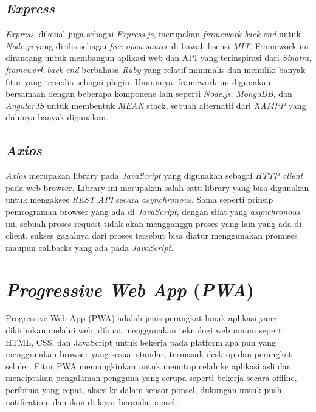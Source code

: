 \subsection{\emph{Express}}
\vspace{1ex}

\emph{Express}, dikenal juga sebagai \emph{Express.js}, merupakan \emph{framework back-end} untuk \emph{Node.js} yang dirilis sebagai \emph{free open-source} di bawah lisensi \emph{MIT}.
Framework ini dirancang untuk membangun aplikasi web dan API yang terinspirasi dari \emph{Sinatra}, \emph{framework back-end} berbahasa \emph{Ruby} yang relatif minimalis dan memiliki banyak fitur yang tersedia sebagai plugin.
Umumnya, framework ini digunakan bersamaan dengan beberapa komponene lain seperti \emph{Node.js}, \emph{MongoDB}, dan \emph{AngularJS} untuk membentuk \emph{MEAN} stack, sebuah alternatif dari \emph{XAMPP} yang dulunya banyak digunakan.
\vspace{0.5ex}

\subsection{\emph{Axios}}
\vspace{1ex}

\emph{Axios} merupakan library pada \emph{JavaScript} yang digunakan sebagai \emph{HTTP client} pada web browser.
Library ini merupakan salah satu library yang bisa digunakan untuk mengakses \emph{REST API} secara \emph{asynchronous}.
Sama seperti prinsip pemrograman browser yang ada di \emph{JavaScript}, dengan sifat yang \emph{asynchronous} ini, sebuah proses request tidak akan mengganggu proses yang lain yang ada di client, sukses gagalnya dari proses tersebut bisa diatur menggunakan promises maupun callbacks yang ada pada \emph{JavaScript}.
\vspace{0.5ex}

\section{\emph{Progressive Web App} (\emph{PWA})}
\vspace{1ex}
Progressive Web App (PWA) adalah jenis perangkat lunak aplikasi yang dikirimkan melalui web, dibuat menggunakan
teknologi web umum seperti HTML, CSS, dan JavaScript untuk bekerja pada platform apa pun yang menggunakan browser
yang sesuai standar, termasuk desktop dan perangkat seluler.
Fitur PWA memungkinkan untuk menutup celah ke aplikasi asli dan menciptakan pengalaman pengguna yang serupa seperti
bekerja secara offline, performa yang cepat, akses ke dalam sensor ponsel, dukungan untuk push notification, dan
ikon di layar beranda ponsel.
\vspace{0.5ex}

